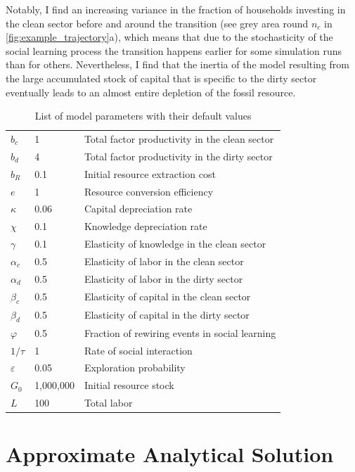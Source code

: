 Notably, I find an increasing variance in the fraction of households investing in the clean sector before and around the transition (see grey area round $n_c$ in \cref{fig:example_trajectory}a), which means that due to the stochasticity of the social learning process the transition happens earlier for some simulation runs than for others. Nevertheless, I find that the inertia of the model resulting from the large accumulated stock of capital that is specific to the dirty sector eventually leads to an almost entire depletion of the fossil resource.

\begin{table}
	\centering
	\begin{tabular}{l|l|l}
		\hline
		$b_c$ & 1 & Total factor productivity in the clean sector \\
		$b_d$ & 4 & Total factor productivity in the dirty sector \\
		$b_R$ & 0.1 & Initial resource extraction cost \\
		$e$   & 1 & Resource conversion efficiency \\
		$\kappa$   & 0.06 & Capital depreciation rate \\
		$\chi$      & 0.1 & Knowledge depreciation rate \\
		$\gamma$	   & 0.1 & Elasticity of knowledge in the clean sector \\
		$\alpha_c$ & 0.5 & Elasticity of labor in the clean sector \\
		$\alpha_d$ & 0.5 & Elasticity of labor in the dirty sector \\
		$\beta_c$ & 0.5 & Elasticity of capital in the clean sector \\
		$\beta_d$ & 0.5 & Elasticity of capital in the dirty sector \\
		$\varphi$ & 0.5 & Fraction of rewiring events in social learning \\
		$1/\tau$ & 1 & Rate of social interaction \\ 
		$\varepsilon$ & 0.05 & Exploration probability \\ 
                $G_0$ & 1,000,000 & Initial resource stock \\
        $L$ & 100 & Total labor \\ 
        \hline
	\end{tabular}
	\caption{List of model parameters with their default values}
	\label{tab:Parameter_list}
\end{table}

\section{Approximate Analytical Solution}
\label{sec:Approximation}

